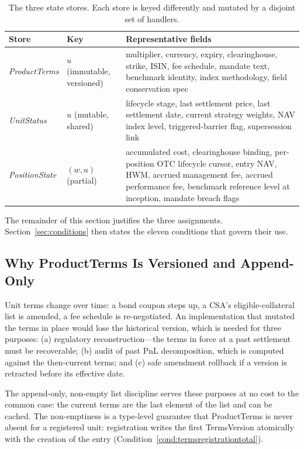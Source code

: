 \documentclass[11pt,a4paper]{article}
\begin{document}
\begin{longtable}{p{3.3cm}p{3cm}p{8.5cm}}
\caption{The three state stores. Each store is keyed differently and mutated by a disjoint set of handlers.}\label{tab:stores}\\
\toprule
\textbf{Store} & \textbf{Key} & \textbf{Representative fields} \\
\midrule
\endfirsthead
\textit{ProductTerms} & $u$ (immutable, versioned) & multiplier, currency, expiry, clearinghouse, strike, ISIN, fee schedule, mandate text, benchmark identity, index methodology, field conservation spec \\
\addlinespace
\textit{UnitStatus} & $u$ (mutable, shared) & lifecycle stage, last settlement price, last settlement date, current strategy weights, NAV index level, triggered-barrier flag, supersession link \\
\addlinespace
\textit{PositionState} & $(w, u)$ (partial) & accumulated cost, clearinghouse binding, per-position OTC lifecycle cursor, entry NAV, HWM, accrued management fee, accrued performance fee, benchmark reference level at inception, mandate breach flags \\
\bottomrule
\end{longtable}

The remainder of this section justifies the three assignments. Section~\ref{sec:conditions} then states the eleven conditions that govern their use.

\subsection{Why ProductTerms Is Versioned and Append-Only}

Unit terms change over time: a bond coupon steps up, a CSA's eligible-collateral list is amended, a fee schedule is re-negotiated. An implementation that mutated the terms in place would lose the historical version, which is needed for three purposes: (a) regulatory reconstruction---the terms in force at a past settlement must be recoverable; (b) audit of past PnL decomposition, which is computed against the then-current terms; and (c) safe amendment rollback if a version is retracted before its effective date.

The append-only, non-empty list discipline serves these purposes at no cost to the common case: the current terms are the last element of the list and can be cached. The non-emptiness is a type-level guarantee that ProductTerms is never absent for a registered unit: registration writes the first TermsVersion atomically with the creation of the entry (Condition~\ref{cond:termsregistrationtotal}).
\end{document}
